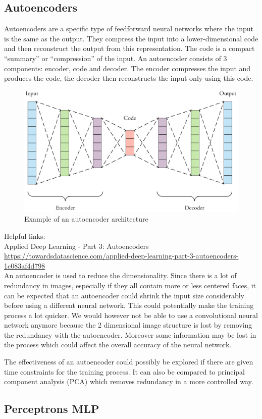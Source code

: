 \subsection{Autoencoders}

Autoencoders are a specific type of feedforward neural networks where the input is the same as the output. They compress the input into a lower-dimensional code and then reconstruct the output from this representation. The code is a compact “summary” or “compression” of the input.
An autoencoder consists of 3 components: encoder, code and decoder. The encoder compresses the input and produces the code, the decoder then reconstructs the input only using this code.

\begin{figure}[hbtp]
	\centering
	\includegraphics[width=1\textwidth]{Images/Autoencoder}
	\caption{Example of an autoencoder architecture}
\end{figure}

Helpful links:\\
Applied Deep Learning - Part 3: Autoencoders
\\
\url{https://towardsdatascience.com/applied-deep-learning-part-3-autoencoders-1c083af4d798}\\

An autoencoder is used to reduce the dimensionality. Since there is a lot of redundancy in images, especially if they all contain more or less centered faces, it can be expected that an autoencoder could shrink the input size considerably before using a different neural network. This could potentially make the training process a lot quicker. We would however not be able to use a convolutional neural network anymore because the 2 dimensional image structure is lost by removing the redundancy with the autoencoder. Moreover some information may be lost in the process which could affect the overall accuracy of the neural network. 

The effectiveness of an autoencoder could possibly be explored if there are given time constraints for the training process. It can also be compared to principal component analysis (PCA) which removes redundancy in a more controlled way. 

\subsection{Perceptrons MLP}




\newpage
